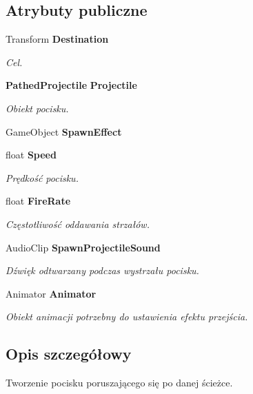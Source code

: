 \subsection*{Atrybuty publiczne}
\begin{DoxyCompactItemize}
\item 
Transform {\bf Destination}
\begin{DoxyCompactList}\small\item\em Cel. \end{DoxyCompactList}\item 
{\bf Pathed\+Projectile} {\bf Projectile}
\begin{DoxyCompactList}\small\item\em Obiekt pocisku. \end{DoxyCompactList}\item 
Game\+Object {\bfseries Spawn\+Effect}\label{class_pathed_projectile_spawner_a05f0c6114aeb62a7f208757f3bb669b0}

\item 
float {\bf Speed}
\begin{DoxyCompactList}\small\item\em Prędkość pocisku. \end{DoxyCompactList}\item 
float {\bf Fire\+Rate}
\begin{DoxyCompactList}\small\item\em Częstotliwość oddawania strzałów. \end{DoxyCompactList}\item 
Audio\+Clip {\bf Spawn\+Projectile\+Sound}
\begin{DoxyCompactList}\small\item\em Dźwięk odtwarzany podczas wystrzału pocisku. \end{DoxyCompactList}\item 
Animator {\bf Animator}
\begin{DoxyCompactList}\small\item\em Obiekt animacji potrzebny do ustawienia efektu przejścia. \end{DoxyCompactList}\end{DoxyCompactItemize}


\subsection{Opis szczegółowy}
Tworzenie pocisku poruszającego się po danej ścieżce. 



